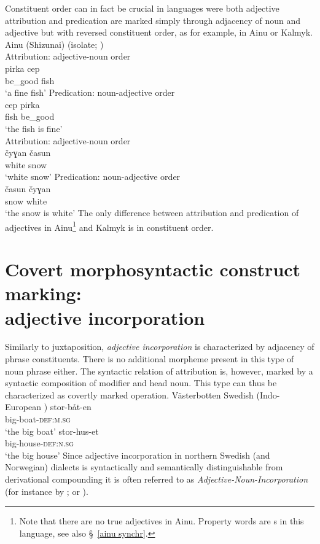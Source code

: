 Constituent order can in fact be crucial in languages were both adjective attribution and predication are marked simply through adjacency of noun and adjective but with reversed constituent order, as for example, in Ainu or Kalmyk. 
\ea
{}
\rm{Ainu (Shizunai) (isolate; \citealt{refsing1986})}\\
\ea \rm{Attribution: adjective-noun order}\\
\gll	pirka cep\\
	be\_good fish\\
\glt	‘a fine fish’
\ex \rm{Predication: noun-adjective order}\\
\gll	cep pirka\\
	fish be\_good\\
\glt	‘the fish is fine’
\z
\z
\ea
{}\\
\ea \rm{Attribution: adjective-noun order}\\
\gll	čyɣan časun\\
	white snow\\
\glt	‘white snow’
\ex \rm{Predication: noun-adjective order}\\
\gll	časun čyɣan\\
	snow white\\
\glt	‘the snow is white’
\z
\z
The only difference between attribution and predication of adjectives in Ainu\footnote{Note that there are no true adjectives in Ainu. Property words are s in this language, see also \S~\ref{ainu synchr}.} and Kalmyk is in constituent order.

\section[Incorporation]{Covert morphosyntactic construct marking:\\adjective incorporation} \label{attr incorporation}
Similarly to juxtaposition, \emph{adjective incorporation} is characterized by adjacency of phrase constituents. There is no additional morpheme present in this type of noun phrase either. The syntactic relation of attribution is, however, marked by a syntactic composition of modifier and head noun. This type can thus be characterized as covertly marked operation.
\ea 
\label{bondska compound}
\rm{Västerbotten Swedish (Indo-European \citep{larsson1929})}
\ea
\gll 	stor-båt-en\\	
	big-boat-\textsc{def:m.sg}\\
\glt	‘the big boat’
\ex
\gll 	stor-hus-et\\
	big-house-\textsc{def:n.sg}\\
\glt	‘the big house’
\z
\z
Since adjective incorporation in northern Swedish (and Norwegian) dialects is syntactically and semantically distinguishable from derivational compounding it is often referred to as \emph{Adjective-Noun-Incorporation} (for instance by \citealt{sandstrom-etal2003}; \citealt[127–129]{dahl2015a} or \citealt[61]{julien2005}).

